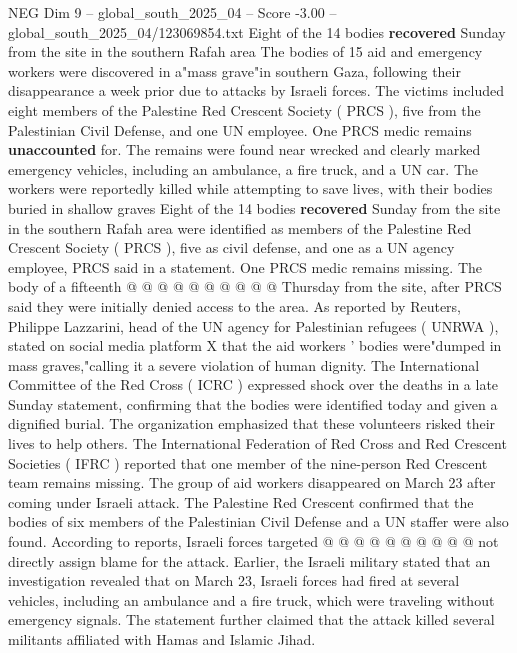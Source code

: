 \begin{textsample}{NEG Dim 9 – global\_south\_2025\_04 – Score -3.00 – global\_south\_2025\_04/123069854.txt}  \label{ex:f9_neg_300}
Eight of the 14 bodies \textbf{recovered} Sunday from the site in the southern Rafah area The bodies of 15 aid and emergency workers were discovered in a"mass grave"in southern Gaza, following their disappearance a week prior due to attacks by Israeli forces.
The victims included eight members of the Palestine Red Crescent Society ( PRCS ), five from the Palestinian Civil Defense, and one UN employee.
One PRCS medic remains \textbf{unaccounted} for.
The remains were found near wrecked and clearly marked emergency vehicles, including an ambulance, a fire truck, and a UN car.
The workers were reportedly killed while attempting to save lives, with their bodies buried in shallow graves Eight of the 14 bodies \textbf{recovered} Sunday from the site in the southern Rafah area were identified as members of the Palestine Red Crescent Society ( PRCS ), five as civil defense, and one as a UN agency employee, PRCS said in a statement.
One PRCS medic remains missing.
The body of a fifteenth @ @ @ @ @ @ @ @ @ @ Thursday from the site, after PRCS said they were initially denied access to the area.
As reported by Reuters, Philippe Lazzarini, head of the UN agency for Palestinian refugees ( UNRWA ), stated on social media platform X that the aid workers ' bodies were"dumped in mass graves,"calling it a severe violation of human dignity.
The International Committee of the Red Cross ( ICRC ) expressed shock over the deaths in a late Sunday statement, confirming that the bodies were identified today and given a dignified burial.
The organization emphasized that these volunteers risked their lives to help others.
The International Federation of Red Cross and Red Crescent Societies ( IFRC ) reported that one member of the nine-person Red Crescent team remains missing.
The group of aid workers disappeared on March 23 after coming under Israeli attack.
The Palestine Red Crescent confirmed that the bodies of six members of the Palestinian Civil Defense and a UN staffer were also found.
According to reports, Israeli forces targeted @ @ @ @ @ @ @ @ @ @ not directly assign blame for the attack.
Earlier, the Israeli military stated that an investigation revealed that on March 23, Israeli forces had fired at several vehicles, including an ambulance and a fire truck, which were traveling without emergency signals.
The statement further claimed that the attack killed several militants affiliated with Hamas and Islamic Jihad.

\end{textsample}
